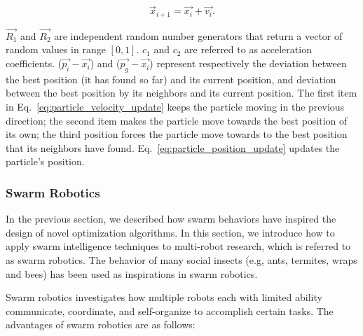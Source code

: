\begin{equation}\label{eq:particle_position_update}
\overrightarrow{x}_{i+1} =  \overrightarrow{x_{i}} + \overrightarrow{v_{i}}.
\end{equation} 

$\overrightarrow{R_{1}}$ and $\overrightarrow{R_{2}}$ are independent random number generators that return a vector of random values in range $[0, 1]$. $c_1$ and $c_2$ are referred to as acceleration coefficients. 
($\overrightarrow{p_{i}} - \overrightarrow{x_{i}}$) and ($\overrightarrow{p_{g}} - \overrightarrow{x_{i}}$) represent respectively the deviation between the best position (it has found so far) and its current position,  and deviation between the best position by its neighbors and its current position. The first item in Eq.~\eqref{eq:particle_velocity_update} keeps the particle moving in the previous direction; the second item makes the particle move towards the best position of its own; the third position forces the particle move towards to the best position that its neighbors have found. Eq.~\eqref{eq:particle_position_update} updates the particle's position.  
 
\subsubsection{Swarm Robotics}\label{sec:swarm_robotics_related_work}

In the previous section, we described how swarm behaviors have inspired the design of novel optimization algorithms. In this section, we introduce how to apply swarm intelligence techniques to multi-robot research, which is referred to as swarm robotics. The behavior of many social insects (e.g, ants, termites, wraps and bees) has been used as inspirations in swarm robotics. 

Swarm robotics investigates how multiple robots each with limited ability communicate, coordinate, and self-organize to accomplish certain tasks. The advantages of swarm robotics are as follows: 

